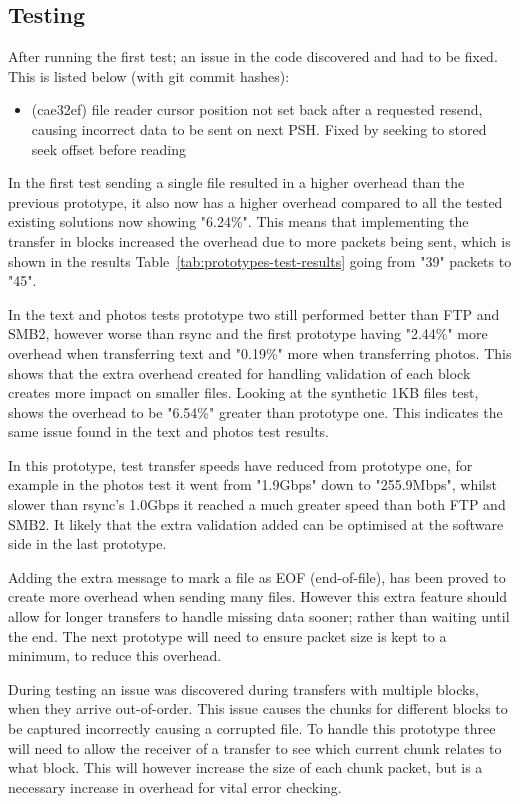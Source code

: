 \subsection*{Testing}
After running the first test; an issue in the code discovered and had to be fixed. This is listed below (with git commit hashes):

\begin{itemize}
    \item (cae32ef) file reader cursor position not set back after a requested resend, causing incorrect data to be sent on next PSH. Fixed by seeking to stored seek offset before reading
\end{itemize}

In the first test sending a single file resulted in a higher overhead than the previous prototype, it also now has a higher overhead compared to all the tested existing solutions now showing "6.24\%". This means that implementing the transfer in blocks increased the overhead due to more packets being sent, which is shown in the results Table~\ref{tab:prototypes-test-results} going from "39" packets to "45".

In the text and photos tests prototype two still performed better than FTP and SMB2, however worse than rsync and the first prototype having "2.44\%" more overhead when transferring text and "0.19\%" more when transferring photos. This shows that the extra overhead created for handling validation of each block creates more impact on smaller files. Looking at the synthetic 1KB files test, shows the overhead to be "6.54\%" greater than prototype one. This indicates the same issue found in the text and photos test results.

In this prototype, test transfer speeds have reduced from prototype one, for example in the photos test it went from "1.9Gbps" down to "255.9Mbps", whilst slower than rsync's 1.0Gbps it reached a much greater speed than both FTP and SMB2. It likely that the extra validation added can be optimised at the software side in the last prototype.

Adding the extra message to mark a file as EOF (end-of-file), has been proved to create more overhead when sending many files. However this extra feature should allow for longer transfers to handle missing data sooner; rather than waiting until the end. The next prototype will need to ensure packet size is kept to a minimum, to reduce this overhead.

During testing an issue was discovered during transfers with multiple blocks, when they arrive out-of-order. This issue causes the chunks for different blocks to be captured incorrectly causing a corrupted file. To handle this prototype three will need to allow the receiver of a transfer to see which current chunk relates to what block. This will however increase the size of each chunk packet, but is a necessary increase in overhead for vital error checking.

